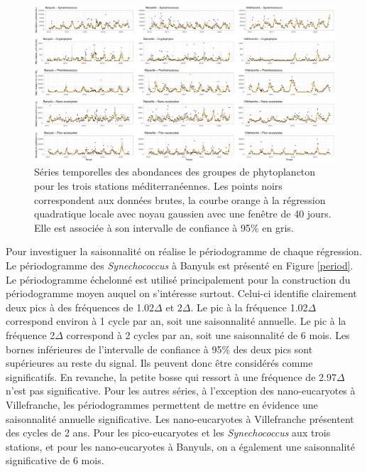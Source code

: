 \documentclass[12pt]{article}
\begin{document}
\begin{figure}
\includegraphics[width=\textheight]{fig/R11_ts_ab.pdf}
\caption{Séries temporelles des abondances des groupes de phytoplancton pour les trois stations méditerranéennes. Les points noirs correspondent aux données brutes, la courbe orange à la régression quadratique locale avec noyau gaussien avec une fenêtre de 40 jours. Elle est associée à son intervalle de confiance à 95\% en gris.}
\label{ts_ab}
\end{figure}

Pour investiguer la saisonnalité on réalise le périodogramme de chaque régression. Le périodogramme des \textit{Synechococcus} à Banyuls est présenté en Figure \ref{period}. Le périodogramme échelonné est utilisé principalement pour la construction du périodogramme moyen auquel on s’intéresse surtout. Celui-ci identifie clairement deux pics à des fréquences de 1.02$\Delta$ et 2$\Delta$. Le pic à la fréquence 1.02$\Delta$ correspond environ à 1 cycle par an, soit une saisonnalité annuelle. Le pic à la fréquence 2$\Delta$ correspond à 2 cycles par an, soit une saisonnalité de 6 mois. Les bornes inférieures de l’intervalle de confiance à 95\% des deux pics sont supérieures au reste du signal. Ils peuvent donc être considérés comme significatifs. En revanche, la petite bosse qui ressort à une fréquence de 2.97$\Delta$ n’est pas significative. Pour les autres séries, à l’exception des nano-eucaryotes à Villefranche, les périodogrammes permettent de mettre en évidence une saisonnalité annuelle significative. Les nano-eucaryotes à Villefranche présentent des cycles de 2 ans. Pour les pico-eucaryotes et les \textit{Synechococcus} aux trois stations, et pour les nano-eucaryotes à Banyuls, on a également une saisonnalité significative de 6 mois.  
\end{document}
